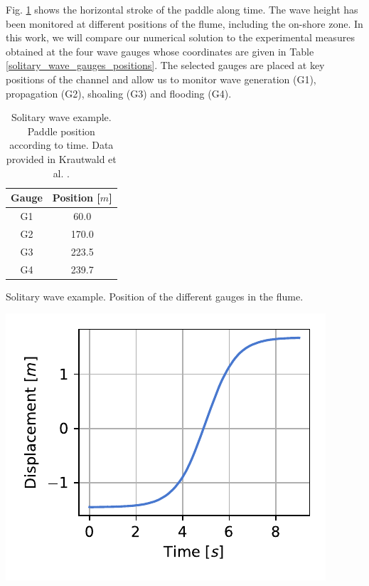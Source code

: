Fig. \ref{piston_stroke} shows the horizontal stroke of the paddle along time. The wave height has been monitored at different positions of the flume, including the on-shore zone. In this work, we will compare our numerical solution to the experimental measures obtained at the four wave gauges whose coordinates are given in Table \ref{solitary_wave_gauges_positions}. The selected gauges are placed at key positions of the channel and allow us to monitor wave generation (G1), propagation (G2), shoaling (G3) and flooding (G4).


\begin{table} [htb]
    \begin{minipage}[b]{.48\textwidth}
    \centering
    \begin{tabular}{cc}
        \hline
        Gauge & Position [$m$] \\ \hline
        G1    &  60.0 \\
        G2    & 170.0 \\
        G3    & 223.5 \\
        G4    & 239.7 \\ \hline
    \end{tabular} \vspace*{20pt}
    \caption{Solitary wave example. Position of the different gauges in the flume.\\}
    \label{solitary_wave_gauges_positions}
    \end{minipage}
    \hfill
    \begin{minipage}[b]{.48\textwidth}
    \centering
    \includegraphics[width=.9\textwidth]{img/coupling/piston_stroke.pdf} \vspace*{-10pt}
    \caption{Solitary wave example. Paddle position according to time. Data provided in Krautwald et al. \cite{krautwald2020,krautwald2021,krautwald2022}.}
    \label{piston_stroke}
    \end{minipage}
\end{table}

